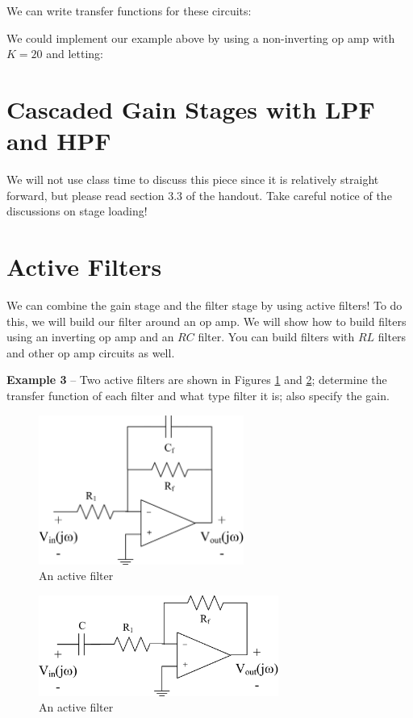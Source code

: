 \documentclass{handout}
\begin{document}
We can write transfer functions for these circuits:
\soln{2in}{
\[
H(j\omega) = \frac{j\omega}{j\omega +\frac{R}{L}}
\]
\[
H(j\omega) = \frac{j\omega}{j\omega +\frac{1}{RC}}
\]
}

We could implement our example above by using a non-inverting op amp with $K=20$ and letting:

\section{Cascaded Gain Stages with LPF and HPF}
We will not use class time to discuss this piece since it is relatively straight forward, but please read section 3.3 of the handout.  Take careful notice of the discussions on stage loading!

\newpage
\clearpage
\pagebreak

\section{Active Filters}
We can combine the gain stage and the filter stage by using active filters!  To do this, we will build our filter around an op amp.  We will show how to build filters using an inverting op amp and an $RC$ filter.  You can build filters with $RL$ filters and other op amp circuits as well.

\textbf{Example 3}  -- Two active filters are shown in Figures \ref{fig: ActiveLPF} and \ref{fig: ActiveHPF}; determine the transfer function of each filter and what type filter it is; also specify the gain.
\begin{figure} [h!]
\centering
\includegraphics[width=0.6\textwidth]{ActiveLPF.jpg}
\caption{An active filter}
\label{fig: ActiveLPF}
\end{figure}
\begin{figure} [h!]
\centering
\includegraphics[width=0.7\textwidth]{ActiveHPF.jpg}
\caption{An active filter}
\label{fig: ActiveHPF}
\end{figure}
\end{document}
